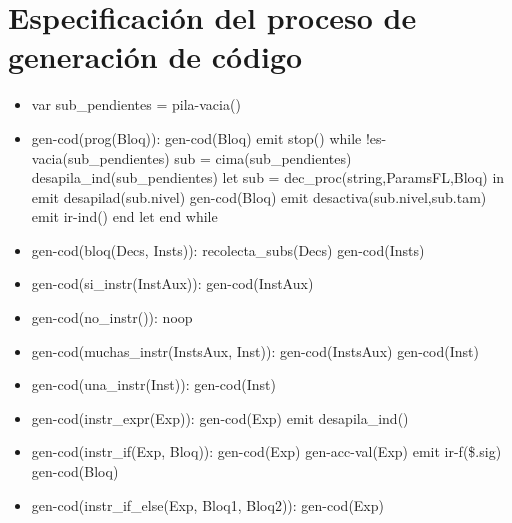 \documentclass[11pt]{article}
\begin{document}
    \section{Especificación del proceso de generación de código}
        \begin{itemize}
            \item var sub\_pendientes = pila-vacia()
            \item gen-cod(prog(Bloq)): 
                \subitem gen-cod(Bloq)
                \subitem emit stop()
                \subitem while !es-vacia(sub\_pendientes)
                    \subsubitem sub = cima(sub\_pendientes)
                    \subsubitem desapila\_ind(sub\_pendientes)
                    \subsubitem let sub = dec\_proc(string,ParamsFL,Bloq) in
                        \subsubitem \hspace{2em} emit desapilad(sub.nivel)
                        \subsubitem \hspace{2em} gen-cod(Bloq)
                        \subsubitem \hspace{2em} emit desactiva(sub.nivel,sub.tam)
                        \subsubitem \hspace{2em} emit ir-ind()
                    \subsubitem end let
                \subitem end while
            \item gen-cod(bloq(Decs, Insts)): 
                \subitem recolecta\_subs(Decs)
                \subitem gen-cod(Insts)
            \item gen-cod(si\_instr(InstAux)): 
                \subitem gen-cod(InstAux)
            \item gen-cod(no\_instr()): 
                \subitem noop
            \item gen-cod(muchas\_instr(InstsAux, Inst)): 
                \subitem gen-cod(InstsAux)
                \subitem gen-cod(Inst)
            \item gen-cod(una\_instr(Inst)): 
                \subitem gen-cod(Inst)
            \item gen-cod(instr\_expr(Exp)): 
                \subitem gen-cod(Exp)
                \subitem emit desapila\_ind()
            \item gen-cod(instr\_if(Exp, Bloq)): 
                \subitem gen-cod(Exp)
                \subitem gen-acc-val(Exp)
                \subitem emit ir-f(\$.sig)
                \subitem gen-cod(Bloq)
            \item gen-cod(instr\_if\_else(Exp, Bloq1, Bloq2)): 
                \subitem gen-cod(Exp)

\end{itemize}
\end{document}
